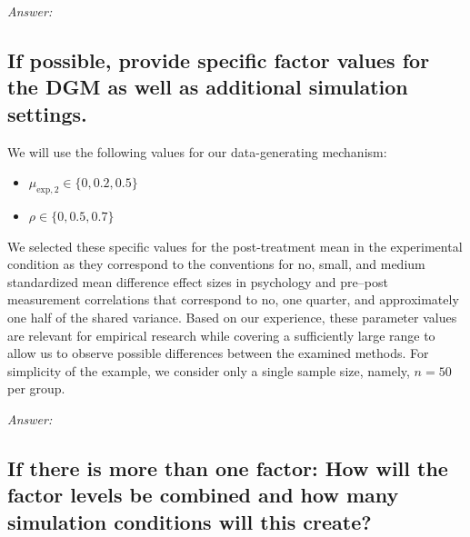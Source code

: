 \documentclass[12pt]{article}
\begin{document}
\textit{Answer:}
    
\subsection{If possible, provide specific factor values for the DGM as well as additional simulation settings.} 

    
\begin{examplebox}
We will use the following values for our data-generating mechanism:
\begin{itemize}
        \item ${\mu_{\text{exp},2}} \in \{0, 0.2, 0.5\}$
        \item $\rho \in \{0, 0.5, 0.7\}$
\end{itemize}
We selected these specific values for the post-treatment mean in the experimental condition as they correspond to the conventions for no, small, and medium standardized mean difference effect sizes in psychology \parencite{Cohen1988} and pre--post measurement correlations that correspond to no, one quarter, and approximately one half of the shared variance. Based on our experience, these parameter values are relevant for empirical research while covering a sufficiently large range to allow us to observe possible differences between the examined methods. For simplicity of the example, we consider only a single sample size, namely, $n = 50$ per group.
\end{examplebox}

\textit{Answer:}

\subsection{If there is more than one factor: How will the factor levels be combined and how many simulation conditions will this create?} 

    
\end{document}
